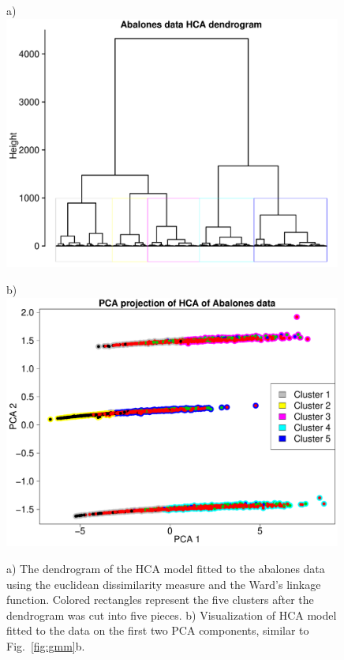 \documentclass[10pt, paper=a4]{article}
\begin{document}
\begin{figure}[h!]
  \begin{minipage}{0.49\textwidth}
    a)\\
    \includegraphics[width = 0.99\textwidth]{HClust_dendrogram.pdf}
  \end{minipage} \hfill
  \begin{minipage}{0.49\textwidth}
    b)\\
    \includegraphics[width = 0.99\textwidth]{HClust_data.pdf}
  \end{minipage} \vfill
  \caption{a) The dendrogram of the HCA model fitted to the abalones data using
    the euclidean dissimilarity measure and the Ward's linkage function.
    Colored rectangles represent the five clusters after the dendrogram was cut
    into five pieces.  b) Visualization of HCA model fitted to the data on the
    first two PCA components, similar to Fig.~\ref{fig:gmm}b.}
  \label{fig:hclust}
\end{figure}
\end{document}
